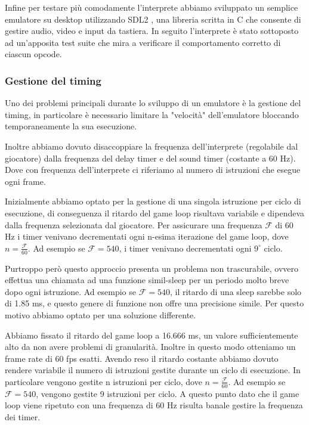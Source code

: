 \documentclass[a4paper]{article}
\begin{document}
Infine per testare più comodamente l'interprete abbiamo sviluppato
un semplice emulatore su desktop utilizzando SDL2
\cite{libsdl:about}, una libreria scritta in C che consente di
gestire audio, video e input da tastiera.
In seguito l'interprete è stato sottoposto ad un'apposita
test suite \cite{github:chip8-test-suite} che mira a verificare
il comportamento corretto di ciascun opcode.

\subsubsection{Gestione del timing}

Uno dei problemi principali durante lo sviluppo di un emulatore è
la gestione del timing, in particolare è necessario limitare la
"velocità" dell'emulatore bloccando temporaneamente la sua
esecuzione.

Inoltre abbiamo dovuto disaccoppiare la frequenza dell'interprete
(regolabile dal giocatore) dalla frequenza del delay timer e del
sound timer (costante a 60 Hz). Dove con frequenza dell'interprete
ci riferiamo al numero di istruzioni che esegue ogni frame.

Inizialmente abbiamo optato per la gestione di una singola istruzione per ciclo di esecuzione,
di conseguenza il ritardo del game loop risultava variabile e dipendeva dalla frequenza selezionata
dal giocatore. Per assicurare una frequenza $\mathcal{F}$ di 60 Hz i timer venivano decrementati
ogni n-esima iterazione del game loop, dove $n = \frac{\mathcal{F}}{60}$. Ad esempio se
$\mathcal{F} = 540$, i timer venivano decrementati ogni $9^{\circ}$ ciclo.

Purtroppo però questo approccio presenta un problema non trascurabile, ovvero effettua una chiamata
ad una funzione simil-sleep per un periodo molto breve dopo ogni istruzione. Ad esempio se
$\mathcal{F} = 540$, il ritardo di una sleep sarebbe solo di 1.85 ms, e questo genere di funzione
non offre una precisione simile. Per questo motivo abbiamo optato per una soluzione differente.

Abbiamo fissato il ritardo del game loop a 16.666 ms, un valore sufficientemente alto da non avere
problemi di granularità. Inoltre in questo modo otteniamo un frame rate di 60 fps esatti.
Avendo reso il ritardo costante abbiamo dovuto rendere variabile il numero di istruzioni gestite
durante un ciclo di esecuzione. In particolare vengono gestite n istruzioni per ciclo,
dove $n = \frac{\mathcal{F}}{60}$. Ad esempio se $\mathcal{F} = 540$, vengono gestite 9 istruzioni
per ciclo. A questo punto dato che il game loop viene ripetuto con una frequenza di 60 Hz risulta
banale gestire la frequenza dei timer.
\end{document}
